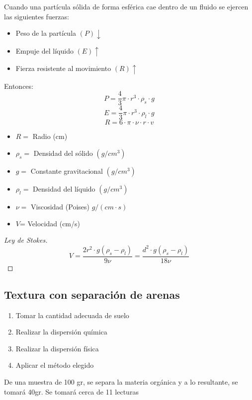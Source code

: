 Cuando una partícula sólida de forma esférica cae dentro de un fluido se ejercen las siguientes fuerzas:
\begin{itemize}
    \item Peso de la partícula $(P)\downarrow$
    \item Empuje del líquido $(E)\uparrow$
    \item Fierza resistente al movimiento $(R)\uparrow$
\end{itemize}
Entonces:
\begin{equation}
    P=\frac{4}{3}\pi\cdot r^3\cdot\rho_s\cdot g
\end{equation}
\begin{equation}
    E=\frac{4}{3}\pi\cdot r^3\cdot \rho_l\cdot g
\end{equation}
\begin{equation}
    R=6\cdot \pi\cdot\nu\cdot r\cdot v
\end{equation}
\begin{notation}
\begin{itemize}
    \item $R=$ Radio (cm)
    \item $\rho_s=$ Densidad del sólido $(g/cm^3)$
    \item $g=$ Constante gravitacional $(g/cm^3)$
    \item $\rho_l=$ Densidad del líquido $(g/cm^3)$
    \item $\nu=$ Viscosidad (Poises) $g/(cm\cdot s)$
    \item $V$= Velocidad (cm/s)
\end{itemize}
\end{notation}
\begin{proof}[Ley de Stokes]
    \begin{equation}
        V = \frac{2r^2\cdot g\left(\rho_s - \rho_l \right)}{9\nu} = \frac{d^2\cdot g\left(\rho_s -\rho_l\right)}{18\nu}
    \end{equation}
\end{proof}
\subsection{Textura con separación de arenas}
\begin{enumerate}
    \item Tomar la cantidad adecuada de suelo
    \item Realizar la dispersión química
    \item Realizar la dispersión física
    \item Aplicar el método elegido
\end{enumerate}
De una muestra de 100 gr, se separa la materia orgánica y a lo resultante, se tomará 40gr. Se tomará cerca de 11 lecturas

